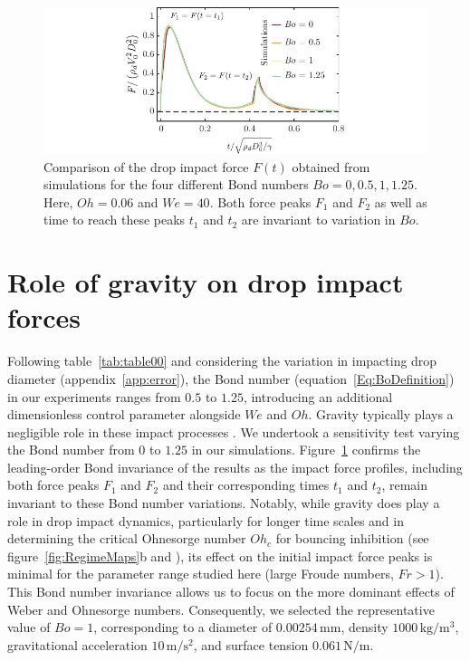 \documentclass{jfm}
\begin{document}
	
	\begin{figure}
		\centering
		\includegraphics[width=\textwidth]{figureA1.pdf}
		\caption{Comparison of the drop impact force $F(t)$ obtained from simulations for the four different Bond numbers $Bo = 0, 0.5, 1, 1.25$. Here, $Oh = 0.06$ and $We = 40$. Both force peaks $F_1$ and $F_2$ as well as time to reach these peaks $t_1$ and $t_2$ are invariant to variation in $Bo$.}
		\label{fig:AppGravity}
	\end{figure}
	
	\section{Role of gravity on drop impact forces}
	\label{app:gravity}
	
	Following table~\ref{tab:table00} and considering the variation in impacting drop diameter (appendix~\ref{app:error}), the Bond number (equation~\eqref{Eq:BoDefinition}) in our experiments ranges from $0.5$ to $1.25$, introducing an additional dimensionless control parameter alongside $We$ and $Oh$. 
	Gravity typically plays a negligible role in these impact processes \citep{sanjay_chantelot_lohse_2023,sanjay2024PRL}. We undertook a sensitivity test varying the Bond number from $0$ to $1.25$ in our simulations. 
	Figure~\ref{fig:AppGravity} confirms the leading-order Bond invariance of the results as the impact force profiles, including both force peaks $F_1$ and $F_2$ and their corresponding times $t_1$ and $t_2$, remain invariant to these Bond number variations.
	Notably, while gravity does play a role in drop impact dynamics, particularly for longer time scales and in determining the critical Ohnesorge number $Oh_c$ for bouncing inhibition (see figure~\ref{fig:RegimeMaps}b and \citet{sanjay_chantelot_lohse_2023}), its effect on the initial impact force peaks is minimal for the parameter range studied here (large Froude numbers, $Fr > 1$). This Bond number invariance allows us to focus on the more dominant effects of Weber and Ohnesorge numbers.
	Consequently, we selected the representative value of $Bo = 1$, corresponding to a diameter of $0.00254\,\si{\milli\meter}$, density $1000\,\si{\kilogram/\meter^3}$, gravitational acceleration $10\,\si{\meter/\second^2}$, and surface tension $0.061\,\si{\newton/\meter}$.
	
	
	
	
	
\end{document}
